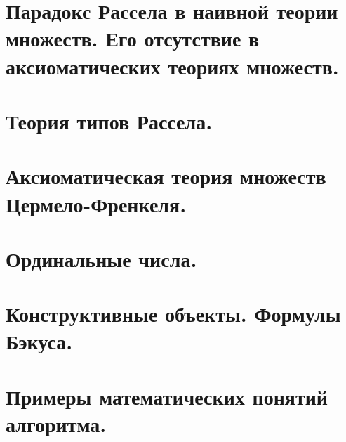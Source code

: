 \documentclass[a4paper,12pt]{article}
\theoremstyle{definition} %
\theoremstyle{definition} %
\theoremstyle{remark} %
\begin{document}
\section{Парадокс Рассела в наивной теории множеств. Его отсутствие в аксиоматических теориях	множеств.}

\section{Теория типов Рассела.}

\section{Аксиоматическая теория множеств Цермело-Френкеля.}

\section{Ординальные числа.}

\section{Конструктивные объекты. Формулы Бэкуса.}

\section{Примеры математических понятий алгоритма.}
\end{document}
